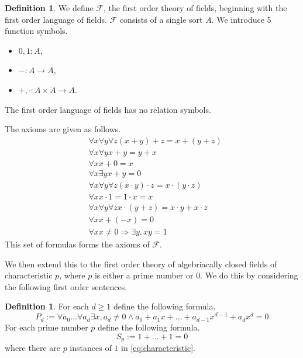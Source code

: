 \documentclass[12pt]{article}
\theoremstyle{plain}
\theoremstyle{definition}
\newtheorem{defn}[thm]{Definition} %
\newcommand{\call}[1]{\mathcal{#1}}
\newcommand{\lto}{\longrightarrow}
\begin{document}
	\begin{defn}\label{def:FoT_fields}
		We define $\call{F}$, the first order theory of fields, beginning with the first order language of fields. $\call{F}$ consists of a single sort $A$. We introduce 5 function symbols.
		\begin{itemize}
			\item $0,1: A$,
			\item $-: A \lto A$,
			\item $+, \cdot: A \times A \lto A$.
			\end{itemize}
		The first order language of fields has no relation symbols.
		
		The axioms are given as follows.
		\begin{align}
			&\forall x \forall y \forall z(x + y) + z = x + (y + z)\\
			&\forall x \forall y x + y = y + x\\
			&\forall x x + 0 = x\\
			&\forall x\exists y x + y = 0\\
			&\forall x \forall y \forall z(x\cdot y)\cdot z = x \cdot (y \cdot z)\\
			&\forall x x \cdot 1 = 1 \cdot x = x\\
			&\forall x \forall y \forall z x\cdot (y + z) = x\cdot y + x \cdot z\\
			&\forall x x + (-x) = 0\\
			&\forall xx\neq 0 \Rightarrow \exists y, xy = 1
			\end{align}
		This set of formulas forms the axioms of $\call{F}$.
		\end{defn}
	
	We then extend this to the first order theory of algebriacally closed fields of characteristic $p$, where $p$ is either a prime number or $0$. We do this by considering the following first order sentences.
	
	\begin{defn}
		For each $d \geq 1$ define the following formula.
		\begin{equation}
			P_d := \forall a_0 \ldots \forall a_d \exists x, a_d \neq 0 \wedge a_0 + a_1 x + \ldots + a_{d-1}x^{d-1} + a_dx^d = 0
			\end{equation}
		For each prime number $p$ define the following formula.
		\begin{equation}\label{eq:characteristic}
			S_p := 1 + \ldots + 1 = 0
			\end{equation}
		where there are $p$ instances of $1$ in \eqref{eq:characteristic}.
		\end{defn}
	
\end{document}
